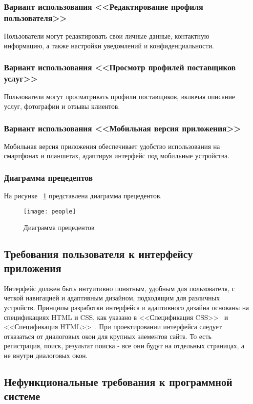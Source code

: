 \subsubsection{Вариант использования <<Редактирование профиля пользователя>>}
Пользователи могут редактировать свои личные данные, контактную информацию, а также настройки уведомлений и конфиденциальности.

\subsubsection{Вариант использования <<Просмотр профилей поставщиков услуг>>}
Пользователи могут просматривать профили поставщиков, включая описание услуг, фотографии и отзывы клиентов.

\subsubsection{Вариант использования <<Мобильная версия приложения>>}
Мобильная версия приложения обеспечивает удобство использования на смартфонах и планшетах, адаптируя интерфейс под мобильные устройства.

\subsubsection{Диаграмма прецедентов}
На рисунке ~\ref{people:image} представлена диаграмма прецедентов.

\begin{figure}[ht]
\centering
\texttt{[image: people]}
\caption{Диаграмма прецедентов}
\label{people:image}
\end{figure}

\subsection{Требования пользователя к интерфейсу приложения}
Интерфейс должен быть интуитивно понятным, удобным для пользователя, с четкой навигацией и адаптивным дизайном, подходящим для различных устройств. Принципы разработки интерфейса и адаптивного дизайна основаны на спецификациях HTML и CSS, как указано в <<Спецификация CSS>>~\cite{cssspecs} и <<Спецификация HTML>>~\cite{htmlbook}.
При проектировании интерфейса следует отказаться от диалоговых окон для крупных элементов сайта. То есть регистрация, поиск, результат поиска - все они будут на отдельных страницах, а не внутри диалоговых окон.

\subsection{Нефункциональные требования к программной системе}

